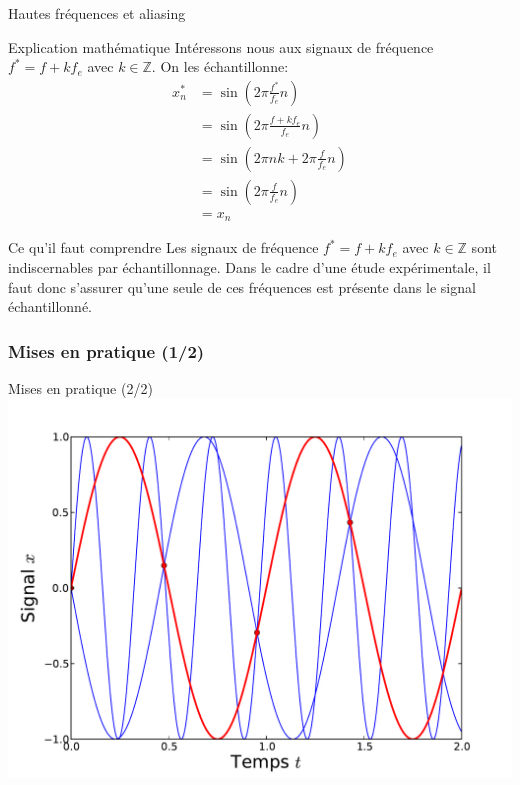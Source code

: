\documentclass[8pt,a4paper]{beamer}
\begin{document}
  
  \begin{frame}{Hautes fréquences et aliasing}
  
  \begin{block}{Explication mathématique}
  Intéressons nous aux signaux de fréquence $f^*=f+k f_e$ avec $k\in \mathbb{Z}$. On les échantillonne:
  \begin{align}
  x_n^* & = \sin(2\pi \frac{f^*}{f_e}n) \nonumber \\
  & = \sin(2\pi \frac{f+k f_e}{f_e}n) \nonumber \\ 
  & = \sin(2\pi n k + 2\pi \frac{f}{f_e}n) \nonumber \\ 
  & = \sin(2\pi \frac{f}{f_e}n) \nonumber \\
  & = x_n \nonumber
  \end{align}
  \end{block}
  \begin{alertblock}{Ce qu'il faut comprendre}
  Les signaux de fréquence $f^*=f+k f_e$ avec $k\in \mathbb{Z}$ sont indiscernables par échantillonnage. Dans le cadre d'une étude expérimentale, il faut donc s'assurer qu'une seule de ces fréquences est présente dans le signal échantillonné.
  \end{alertblock}
  \end{frame}
  
  \begin{frame}[containsverbatim]
  \frametitle{Mises en pratique (1/2)}
  
  \end{frame}
  
  \begin{frame}{Mises en pratique (2/2)}
  \includegraphics[width=.9\textwidth]{figures/exemple_aliasing.pdf}\\
  \end{frame}
  
\end{document}
